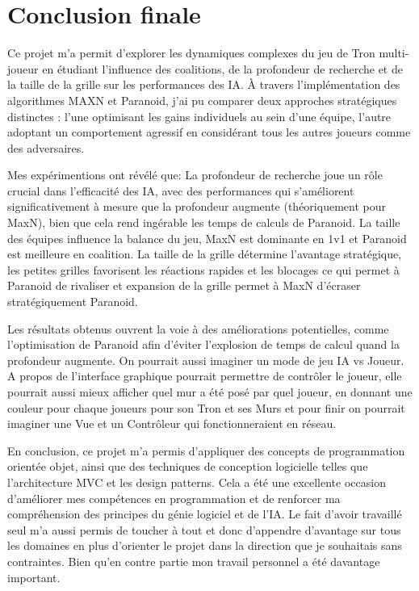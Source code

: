 \documentclass[a4paper,12pt]{article}
\begin{document}
\section{Conclusion finale}
Ce projet m'a permit d'explorer les dynamiques complexes du jeu de Tron multi-joueur en étudiant l'influence des coalitions, de la profondeur de recherche et de la taille de la grille sur les performances des IA. À travers l'implémentation des algorithmes MAXN et Paranoid, j'ai pu comparer deux approches stratégiques distinctes : l'une optimisant les gains individuels au sein d'une équipe, l'autre adoptant un comportement agressif en considérant tous les autres joueurs comme des adversaires.

Mes expérimentions ont révélé que:
La profondeur de recherche joue un rôle crucial dans l'efficacité des IA, avec des performances qui s'améliorent significativement à mesure que la profondeur augmente (théoriquement pour MaxN), bien que cela rend ingérable les temps de calculs de Paranoid.
La taille des équipes influence la balance du jeu, MaxN est dominante en 1v1 et Paranoid est meilleure en coalition.
La taille de la grille détermine l'avantage stratégique, les petites grilles favorisent les réactions rapides et les blocages ce qui permet à Paranoid de rivaliser et expansion de la grille permet à MaxN d'écraser stratégiquement Paranoid.

Les résultats obtenus ouvrent la voie à des améliorations potentielles, comme l'optimisation de Paranoid afin d'éviter l'explosion de temps de calcul quand la profondeur augmente. On pourrait aussi imaginer un mode de jeu IA vs Joueur. A propos de l'interface graphique pourrait permettre de contrôler le joueur, elle pourrait aussi mieux afficher quel mur a été posé par quel joueur, en donnant une couleur pour chaque joueurs pour son Tron et ses Murs et pour finir on pourrait imaginer une Vue et un Contrôleur qui fonctionneraient en réseau.

En conclusion, ce projet m'a permis d'appliquer des concepts de programmation orientée objet, ainsi que des techniques de conception logicielle telles que l'architecture MVC
et les design patterns. Cela a été une excellente occasion d'améliorer mes compétences en
programmation et de renforcer ma compréhension des principes du génie logiciel et de l'IA. Le
fait d'avoir travaillé seul m'a aussi permis de toucher à tout et donc d'appendre d'avantage sur tous les domaines en plus d'orienter le projet dans la direction que je souhaitais sans contraintes. Bien qu'en contre partie mon travail personnel a été davantage important.
\end{document}
